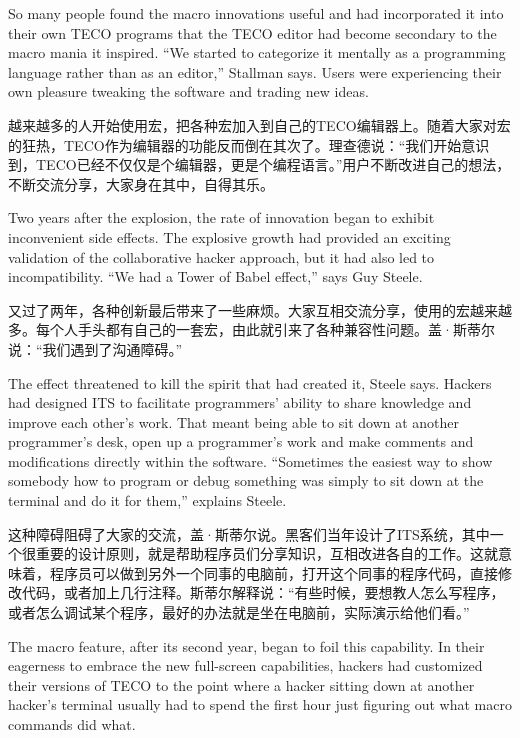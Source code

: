 \ifdefined\eng
So many people found the macro innovations useful and had incorporated it into their own TECO programs that the TECO editor had become secondary to the macro mania it inspired. ``We started to categorize it mentally as a programming language rather than as an editor,'' Stallman says. Users were experiencing their own pleasure tweaking the software and trading new ideas.
\fi

\ifdefined\chs
越来越多的人开始使用宏，把各种宏加入到自己的TECO编辑器上。随着大家对宏的狂热，TECO作为编辑器的功能反而倒在其次了。理查德说：“我们开始意识到，TECO已经不仅仅是个编辑器，更是个编程语言。”用户不断改进自己的想法，不断交流分享，大家身在其中，自得其乐。
\fi

\ifdefined\eng
Two years after the explosion, the rate of innovation began to exhibit inconvenient side effects. The explosive growth had provided an exciting validation of the collaborative hacker approach, but it had also led to incompatibility. ``We had a Tower of Babel effect,'' says Guy Steele.
\fi

\ifdefined\chs
又过了两年，各种创新最后带来了一些麻烦。大家互相交流分享，使用的宏越来越多。每个人手头都有自己的一套宏，由此就引来了各种兼容性问题。盖·斯蒂尔说：“我们遇到了沟通障碍。”
\fi

\ifdefined\eng
The effect threatened to kill the spirit that had created it, Steele says. Hackers had designed ITS to facilitate programmers' ability to share knowledge and improve each other's work. That meant being able to sit down at another programmer's desk, open up a programmer's work and make comments and modifications directly within the software. ``Sometimes the easiest way to show somebody how to program or debug something was simply to sit down at the terminal and do it for them,'' explains Steele.
\fi

\ifdefined\chs
这种障碍阻碍了大家的交流，盖·斯蒂尔说。黑客们当年设计了ITS系统，其中一个很重要的设计原则，就是帮助程序员们分享知识，互相改进各自的工作。这就意味着，程序员可以做到另外一个同事的电脑前，打开这个同事的程序代码，直接修改代码，或者加上几行注释。斯蒂尔解释说：“有些时候，要想教人怎么写程序，或者怎么调试某个程序，最好的办法就是坐在电脑前，实际演示给他们看。”
\fi

\ifdefined\eng
The macro feature, after its second year, began to foil this capability. In their eagerness to embrace the new full-screen capabilities, hackers had customized their versions of TECO to the point where a hacker sitting down at another hacker's terminal usually had to spend the first hour just figuring out what macro commands did what.
\fi

